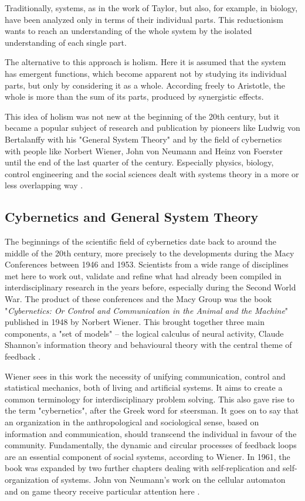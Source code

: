\documentclass[a4paper,12pt]{article}
\begin{document}
Traditionally, systems, as in the work of Taylor, but also, for example, in
biology, have been analyzed only in terms of their individual parts. This
reductionism wants to reach an understanding of the whole system by the
isolated understanding of each single part.

The alternative to this approach is holism. Here it is assumed that the system
has emergent functions, which become apparent not by studying its individual
parts, but only by considering it as a whole. According freely to Aristotle,
the whole is more than the sum of its parts, produced by synergistic effects.

This idea of holism was not new at the beginning of the 20th century, but it
became a popular subject of research and publication by pioneers like Ludwig
von Bertalanffy with his "General System Theory" and by the field of
cybernetics with people like Norbert Wiener, John von Neumann and Heinz von
Foerster until the end of the last quarter of the century.  Especially
physics, biology, control engineering and the social sciences dealt with
systems theory in a more or less overlapping way \cite{jackson:2003}.

\subsection{Cybernetics and General System Theory}	
The beginnings of the scientific field of cybernetics date back to around the
middle of the 20th century, more precisely to the developments during the Macy
Conferences between 1946 and 1953. Scientists from a wide range of disciplines
met here to work out, validate and refine what had already been compiled in
interdisciplinary research in the years before, especially during the Second
World War. The product of these conferences and the Macy Group was the book
"\textit{Cybernetics: Or Control and Communication in the Animal and the
  Machine}" published in 1948 by Norbert Wiener. This brought together three
main components, a "set of models" -- the logical calculus of neural activity,
Claude Shannon's information theory and behavioural theory with the central
theme of feedback \cite{pias:2004}. 

Wiener sees in this work the necessity of unifying communication, control and
statistical mechanics, both of living and artificial systems. It aims to
create a common terminology for interdisciplinary problem solving. This also
gave rise to the term "cybernetics", after the Greek word for steersman.  It
goes on to say that an organization in the anthropological and sociological
sense, based on information and communication, should transcend the individual
in favour of the community. Fundamentally, the dynamic and circular processes
of feedback loops are an essential component of social systems, according to
Wiener.  In 1961, the book was expanded by two further chapters dealing with
self-replication and self-organization of systems. John von Neumann's work on
the cellular automaton and on game theory receive particular attention here
\cite{wiener:1948}.
\end{document}
